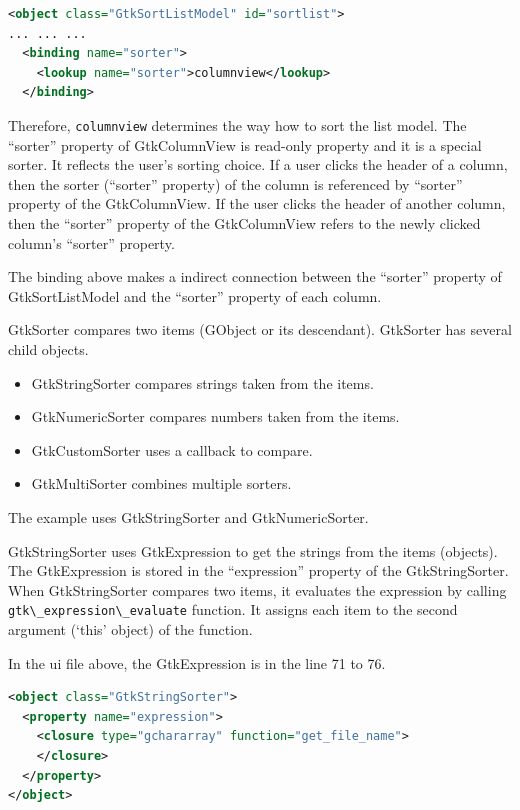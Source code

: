 \begin{lstlisting}[language=XML]
<object class="GtkSortListModel" id="sortlist">
... ... ...
  <binding name="sorter">
    <lookup name="sorter">columnview</lookup>
  </binding>
\end{lstlisting}

Therefore, \passthrough{\lstinline!columnview!} determines the way how
to sort the list model. The ``sorter'' property of GtkColumnView is
read-only property and it is a special sorter. It reflects the user's
sorting choice. If a user clicks the header of a column, then the sorter
(``sorter'' property) of the column is referenced by ``sorter'' property
of the GtkColumnView. If the user clicks the header of another column,
then the ``sorter'' property of the GtkColumnView refers to the newly
clicked column's ``sorter'' property.

The binding above makes a indirect connection between the ``sorter''
property of GtkSortListModel and the ``sorter'' property of each column.

GtkSorter compares two items (GObject or its descendant). GtkSorter has
several child objects.

\begin{itemize}
\tightlist
\item
  GtkStringSorter compares strings taken from the items.
\item
  GtkNumericSorter compares numbers taken from the items.
\item
  GtkCustomSorter uses a callback to compare.
\item
  GtkMultiSorter combines multiple sorters.
\end{itemize}

The example uses GtkStringSorter and GtkNumericSorter.

GtkStringSorter uses GtkExpression to get the strings from the items
(objects). The GtkExpression is stored in the ``expression'' property of
the GtkStringSorter. When GtkStringSorter compares two items, it
evaluates the expression by calling
\passthrough{\lstinline!gtk\_expression\_evaluate!} function. It assigns
each item to the second argument (`this' object) of the function.

In the ui file above, the GtkExpression is in the line 71 to 76.

\begin{lstlisting}[language=XML]
<object class="GtkStringSorter">
  <property name="expression">
    <closure type="gchararray" function="get_file_name">
    </closure>
  </property>
</object>
\end{lstlisting}

